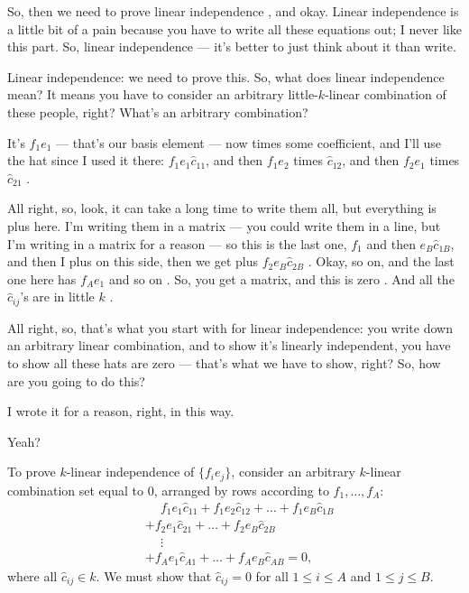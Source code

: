 \begin{proofWrapper}
\begin{speech}[00:33:55 - 00:36:15]
So, then we need to prove linear independence , and okay. Linear independence is a little bit of a pain because you have to write all these equations out; I never like this part. So, linear independence --- it's better to just think about it than write.

Linear independence: we need to prove this. So, what does linear independence mean? It means you have to consider an arbitrary little-$k$-linear combination of these people, right? What's an arbitrary combination?

It's $f_1 e_1$ --- that's our basis element --- now times some coefficient, and I'll use the hat since I used it there: $f_1 e_1 \hat{c}_{11}$, and then $f_1 e_2$ times $\hat{c}_{12}$, and then $f_2 e_1$ times $\hat{c}_{21}$ .

All right, so, look, it can take a long time to write them all, but everything is plus here. I'm writing them in a matrix --- you could write them in a line, but I'm writing in a matrix for a reason --- so this is the last one, $f_1$ and then $e_B \hat{c}_{1B}$, and then I plus on this side, then we get plus $f_2 e_B \hat{c}_{2B}$ . Okay, so on, and the last one here has $f_A e_1$ and so on . So, you get a matrix, and this is zero . And all the $\hat{c}_{ij}$'s are in little $k$ .

All right, so, that's what you start with for linear independence: you write down an arbitrary linear combination, and to show it's linearly independent, you have to show all these hats are zero --- that's what we have to show, right? So, how are you going to do this?

I wrote it for a reason, right, in this way. 

Yeah?
\end{speech}

\begin{content}
To prove $k$-linear independence of $\{f_i e_j\}$, consider an arbitrary $k$-linear combination set equal to $0$, arranged by rows according to $f_1, \dots, f_A$:
\begin{align*}
  &\phantom{+} f_1 e_1 \hat{c}_{11} + f_1 e_2 \hat{c}_{12} + \dots + f_1 e_B \hat{c}_{1B} \\
  &+ f_2 e_1 \hat{c}_{21} + \dots + f_2 e_B \hat{c}_{2B} \\
  &\phantom{+} \vdots \\
  &+ f_A e_1 \hat{c}_{A1} + \dots + f_A e_B \hat{c}_{AB} = 0,
\end{align*}
where all $\hat{c}_{ij} \in k$. We must show that $\hat{c}_{ij} = 0$ for all $1 \le i \le A$ and $1 \le j \le B$.
\end{content}


\end{proofWrapper}
